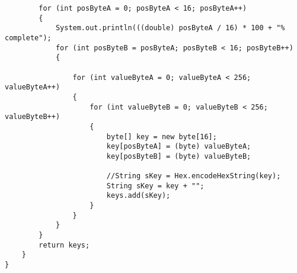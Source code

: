 \documentclass[12pt]{article}
\theoremstyle{plain}
\begin{document}
\begin{lstlisting}
		for (int posByteA = 0; posByteA < 16; posByteA++)
		{
			System.out.println(((double) posByteA / 16) * 100 + "% complete");
			for (int posByteB = posByteA; posByteB < 16; posByteB++)
			{

				for (int valueByteA = 0; valueByteA < 256; valueByteA++)
				{
					for (int valueByteB = 0; valueByteB < 256; valueByteB++)
					{
						byte[] key = new byte[16];
						key[posByteA] = (byte) valueByteA;
						key[posByteB] = (byte) valueByteB;

						//String sKey = Hex.encodeHexString(key);
						String sKey = key + "";
						keys.add(sKey);
					}
				}
			}
		}
		return keys;
	}
}
\end{lstlisting}
\end{document}
